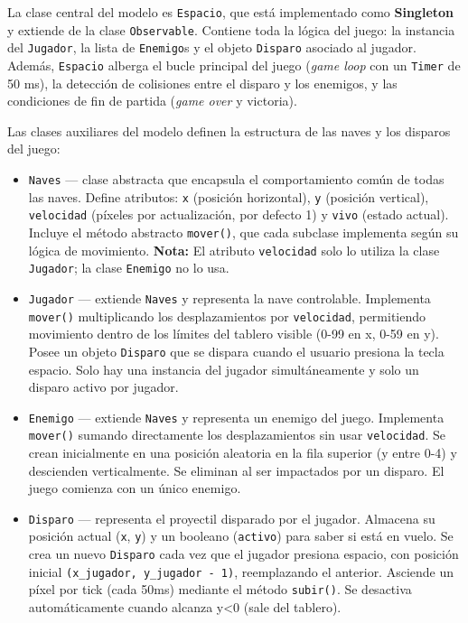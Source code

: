 \documentclass[12pt, a4paper]{article}
\begin{document}
\begin{description}[leftmargin=2em, style=nextline]
    \item[\textbf{Modelo}]
        La clase central del modelo es \texttt{Espacio}, que está implementado como \textbf{Singleton} y extiende de la clase \texttt{Observable}. Contiene toda la lógica del juego: la instancia del \texttt{Jugador}, la lista de \texttt{Enemigo}s y el objeto \texttt{Disparo} asociado al jugador. Además, \texttt{Espacio} alberga el bucle principal del juego (\textit{game loop} con un \texttt{Timer} de 50 ms), la detección de colisiones entre el disparo y los enemigos, y las condiciones de fin de partida (\textit{game over} y victoria).

        Las clases auxiliares del modelo definen la estructura de las naves y los disparos del juego:
        \begin{itemize}[leftmargin=2em]
            \item \texttt{Naves} — clase abstracta que encapsula el comportamiento común de todas las naves. Define atributos: \texttt{x} (posición horizontal), \texttt{y} (posición vertical), \texttt{velocidad} (píxeles por actualización, por defecto 1) y \texttt{vivo} (estado actual). Incluye el método abstracto \texttt{mover()}, que cada subclase implementa según su lógica de movimiento. \textbf{Nota:} El atributo \texttt{velocidad} solo lo utiliza la clase \texttt{Jugador}; la clase \texttt{Enemigo} no lo usa.
            \item \texttt{Jugador} — extiende \texttt{Naves} y representa la nave controlable. Implementa \texttt{mover()} multiplicando los desplazamientos por \texttt{velocidad}, permitiendo movimiento dentro de los límites del tablero visible (0-99 en x, 0-59 en y). Posee un objeto \texttt{Disparo} que se dispara cuando el usuario presiona la tecla espacio. Solo hay una instancia del jugador simultáneamente y solo un disparo activo por jugador.
            \item \texttt{Enemigo} — extiende \texttt{Naves} y representa un enemigo del juego. Implementa \texttt{mover()} sumando directamente los desplazamientos sin usar \texttt{velocidad}. Se crean inicialmente en una posición aleatoria en la fila superior (y entre 0-4) y descienden verticalmente. Se eliminan al ser impactados por un disparo. El juego comienza con un único enemigo.
            \item \texttt{Disparo} — representa el proyectil disparado por el jugador. Almacena su posición actual (\texttt{x}, \texttt{y}) y un booleano (\texttt{activo}) para saber si está en vuelo. Se crea un nuevo \texttt{Disparo} cada vez que el jugador presiona espacio, con posición inicial \texttt{(x\_jugador, y\_jugador - 1)}, reemplazando el anterior. Asciende un píxel por tick (cada 50ms) mediante el método \texttt{subir()}. Se desactiva automáticamente cuando alcanza y<0 (sale del tablero).
        \end{itemize}


\end{description}
\end{document}
